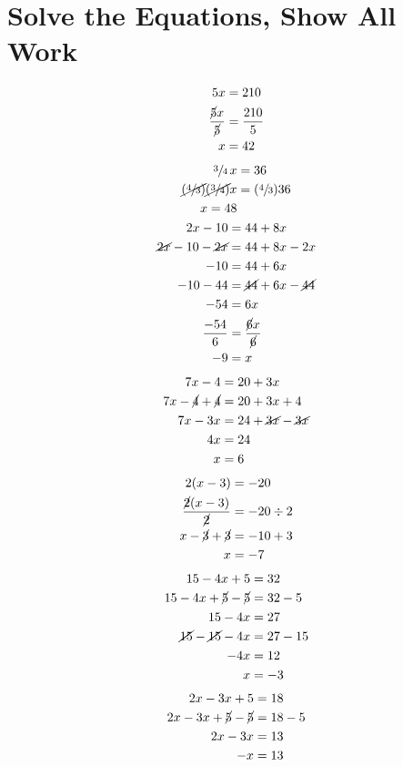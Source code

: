 \documentclass[11pt]{article} %
\begin{document}
\section{Solve the Equations, Show All Work}
\begin{align*}
5x &= 210 \\
 \frac{\cancel{5}x}{\cancel{5}} &= \frac{210}{5} \\
x&=42
\end{align*}
\begin{align*}
\sfrac{3}{4} \, x &= 36 \\
\cancel{(\sfrac{4}{3})}\cancel{(\sfrac{3}{4})}x &= (\sfrac{4}{3}) 36 \\
 x=48
\end{align*}
\begin{align*}
2x - 10 &= 44 + 8x \\
\cancel{2x} - 10 - \cancel{2x} &= 44 + 8x - 2x \\
-10 &= 44 + 6x \\
-10 - 44 &= \cancel{44}+ 6x -\cancel{44} \\
-54 &= 6x \\
\frac{-54}{6} &=\frac{\cancel{6}x}{\cancel{6}} \\
-9 &= x
\end{align*}
\begin{align*}
7x - 4 &= 20 + 3x \\
7x - {\cancel{4}}+{\cancel{4}} &= 20 + 3x + 4 \\
7x -3x &= 24 + {\cancel{3x}} - {\cancel{3x}} \\
4x &= 24 \\
x &= 6
\end{align*}
\begin{align*}
2(x-3) &= -20 \\
\frac{\cancel{2}(x - 3)}{\cancel{2}} &= -20 \div 2 \\
x - \cancel{3} + \cancel{3} &= -10 + 3 \\
x &= -7
\end{align*}
\begin{align*}
15 - 4x + 5 &= 32 \\ 
15 - 4x + {\cancel{5}} - {\cancel{5}} &= 32 - 5 \\
15 - 4x &= 27 \\
{\cancel{15}} - {\cancel{15}} - 4x  &= 27 - 15 \\
-4x &= 12 \\
x &= -3
\end{align*}
\begin{align*}
2x - 3x + 5 &= 18 \\
2x -3x + {\cancel{5}} - {\cancel{5}} &= 18 - 5 \\
2x -3x &= 13 \\
-x &= 13
\end{align*}
\end{document}
